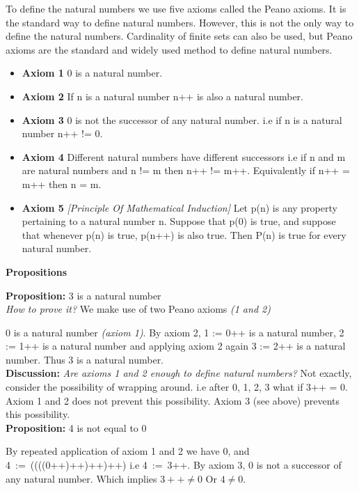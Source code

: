\documentclass[10pt]{article}
\begin{document}
To define the natural numbers we use five axioms called the Peano axioms. It is
the standard way to define natural numbers.
However, this is not the only way to define the natural numbers. Cardinality of
finite sets can also be used, but Peano axioms are the standard and widely used
method to define natural numbers.

\begin{itemize}
\setlength{\itemsep}{0pt}
\item[] \textbf{Axiom 1} 0 is a natural number.
\item[] \textbf{Axiom 2} If n is a natural number n++ is also a natural number.
\item[] \textbf{Axiom 3} 0 is not the successor of any natural number. i.e if n is a natural
number n++ != 0.
\item[] \textbf{Axiom 4} Different natural numbers have different successors i.e if n and m are
natural numbers and n != m then n++ != m++. Equivalently if n++ = m++ then n =
m.
\item[] \textbf{Axiom 5} \emph{[Principle Of Mathematical Induction]} Let p(n) is any property pertaining
to a natural number n. Suppose that p(0) is true, and suppose that whenever p(n)
is true, p(n++) is also true. Then P(n) is true for every natural number.
\end{itemize}

\begin{flushleft}
\textbf{\large{Propositions}}
\end{flushleft}

\textbf{Proposition:} 3 is a natural number
\\[4pt]
\emph{How to prove it?} We make use of two Peano axioms \emph{(1 and 2)}

0 is a natural number \emph{(axiom 1)}. By axiom 2, 1 := 0++ is a natural
number, 2 := 1++ is a natural number and applying axiom 2 again 3 := 2++ is a
natural number. Thus 3 is a natural number.
\\[4pt]
\textbf{Discussion:} \emph{Are axioms 1 and 2 enough to define natural numbers?}
Not exactly, consider the possibility of wrapping around. i.e after 0, 1, 2, 3
what if 3++ = 0. Axiom 1 and 2 does not prevent this possibility. Axiom 3 (see
above) prevents this possibility.
\\[4pt]
\textbf{Proposition:} 4 is not equal to 0

By repeated application of axiom 1 and 2 we have 0, and 4~:=~((((0++)\-++)++)++)
i.e 4~:=~3++. By axiom 3, 0 is not a successor of any natural number. Which
implies $3++ \ne  0$ Or $4 \ne 0$.
\end{document}
